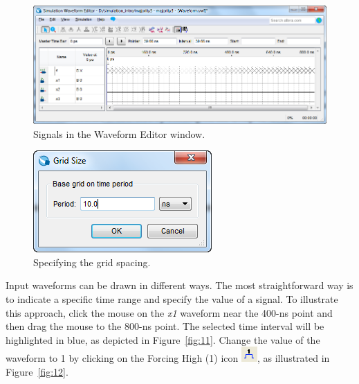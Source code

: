 \documentclass[11pt, twoside, pdftex]{article}
\begin{document}
\begin{figure}[H]
   \begin{center}
      \includegraphics[scale=0.65]{figures/figure9.png}
   \caption{Signals in the Waveform Editor window.} 
	 \label{fig:9}
	 \end{center}
\end{figure}

\begin{figure}[H]
   \begin{center}
      \includegraphics[scale=0.7]{figures/figure10.png}
   \caption{Specifying the grid spacing.} 
	 \label{fig:10}
	 \end{center}
\end{figure}

Input waveforms can be drawn in different ways. The most straightforward way is to indicate a
specific time range and specify the value of a signal. To illustrate this approach, click the
mouse on the {\it x1} waveform near the 400-ns point and then drag the mouse to the 800-ns point. 
The selected time interval will be highlighted in blue, as depicted in Figure~\ref{fig:11}. 
Change the value of the waveform to 1 by
clicking on the {\sf Forcing High (1)} icon \hbox{\includegraphics[scale=0.7]{figures/icon2.png}}, as illustrated 
in Figure~\ref{fig:12}.
~\\
\end{document}
